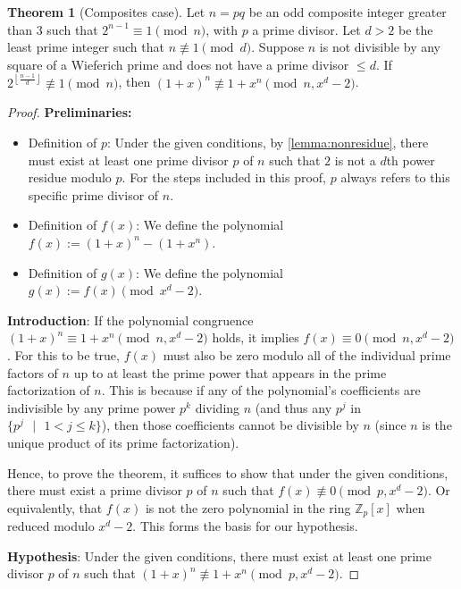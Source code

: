 \documentclass{article}
\theoremstyle{plain}
\theoremstyle{definition}
\newtheorem{theorem}{Theorem}
\begin{document}
\begin{theorem}[Composites case] \label{theorem:composites}
Let $n = pq$ be an odd composite integer greater than $3$ such that $2^{n-1} \equiv 1 \pmod{n}$, with $p$ a prime divisor. Let $d > 2$ be the least prime integer such that $n \not\equiv 1 \pmod{d}$. Suppose $n$ is not divisible by any square of a Wieferich prime and does not have a prime divisor $\leq d$. If $2^{\left\lfloor\frac{n-1}{d}\right\rfloor} \not\equiv 1 \pmod{n}$, then $(1 + x)^n \not\equiv 1 + x^n \pmod{n, x^d-2}$.
\end{theorem}
\begin{proof}
\textbf{Preliminaries:}
\begin{itemize}
    \item Definition of $p$: Under the given conditions, by \cref{lemma:nonresidue}, there must exist at least one prime divisor $p$ of $n$ such that $2$ is not a $d$th power residue modulo $p$. For the steps included in this proof, $p$ always refers to this specific prime divisor of $n$.
    \item Definition of $f(x)$: We define the polynomial $f(x) := (1 + x)^n - (1 + x^n)$.
    \item Definition of $g(x)$: We define the polynomial $g(x) := f(x) \pmod{x^d - 2}$.
\end{itemize}

\textbf{Introduction}:
If the polynomial congruence $(1 + x)^n \equiv 1 + x^n \pmod{n, x^d-2}$ holds, it implies $f(x) \equiv 0 \pmod{n, x^d-2}$. For this to be true, $f(x)$ must also be zero modulo all of the individual prime factors of $n$ up to at least the prime power that appears in the prime factorization of $n$. This is because if any of the polynomial's coefficients are indivisible by any prime power $p^k$ dividing $n$ (and thus any $p^j$ in $\{ p^j \text{ } | \text{ } 1 < j \leq k \}$), then those coefficients cannot be divisible by $n$ (since $n$ is the unique product of its prime factorization).

Hence, to prove the theorem, it suffices to show that under the given conditions, there must exist a prime divisor $p$ of $n$ such that $f(x) \not\equiv 0 \pmod{p, x^d-2}$. Or equivalently, that $f(x)$ is not the zero polynomial in the ring $\mathbb{Z}_p[x]$ when reduced modulo $x^d-2$. This forms the basis for our hypothesis.

\textbf{Hypothesis}: Under the given conditions, there must exist at least one prime divisor $p$ of $n$ such that $(1 + x)^n \not\equiv 1 + x^n \pmod{p, x^d-2}$.


\end{proof}
\end{document}
